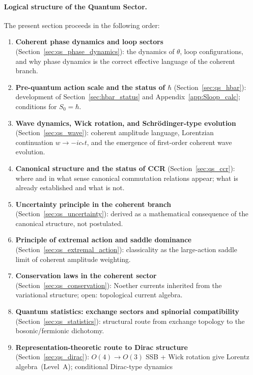 \paragraph{Logical structure of the Quantum Sector.}
The present section proceeds in the following order:
\begin{enumerate}[label=(\arabic*)]
  \item \textbf{Coherent phase dynamics and loop sectors}
    (Section~\ref{sec:qs_phase_dynamics}):
    the dynamics of $\theta$, loop configurations, and why
    phase dynamics is the correct effective language of the
    coherent branch.
  \item \textbf{Pre-quantum action scale and the status of $\hbar$}
    (Section~\ref{sec:qs_hbar}):
    development of Section~\ref{sec:hbar_status}
    and Appendix~\ref{app:Sloop_calc};
    conditions for $S_0 = \hbar$.
  \item \textbf{Wave dynamics, Wick rotation, and
    Schr\"odinger-type evolution}
    (Section~\ref{sec:qs_wave}):
    coherent amplitude language, Lorentzian continuation
    $w\to -ic_*t$, and the emergence of first-order
    coherent wave evolution.
  \item \textbf{Canonical structure and the status of CCR}
    (Section~\ref{sec:qs_ccr}):
    where and in what sense canonical commutation relations
    appear; what is already established and what is not.
  \item \textbf{Uncertainty principle in the coherent branch}
    (Section~\ref{sec:qs_uncertainty}):
    derived as a mathematical consequence of the canonical
    structure, not postulated.
  \item \textbf{Principle of extremal action and saddle dominance}
    (Section~\ref{sec:qs_extremal_action}):
    classicality as the large-action saddle limit of coherent
    amplitude weighting.
  \item \textbf{Conservation laws in the coherent sector}
    (Section~\ref{sec:qs_conservation}):
    Noether currents inherited from the variational structure;
    open: topological current algebra.
  \item \textbf{Quantum statistics: exchange sectors and
    spinorial compatibility}
    (Section~\ref{sec:qs_statistics}):
    structural route from exchange topology to the
    bosonic/fermionic dichotomy.
  \item \textbf{Representation-theoretic route to Dirac structure}
    (Section~\ref{sec:qs_dirac}):
    $O(4)\to O(3)$ SSB + Wick rotation give Lorentz
    algebra~(Level~A); conditional Dirac-type dynamics

\end{enumerate}

